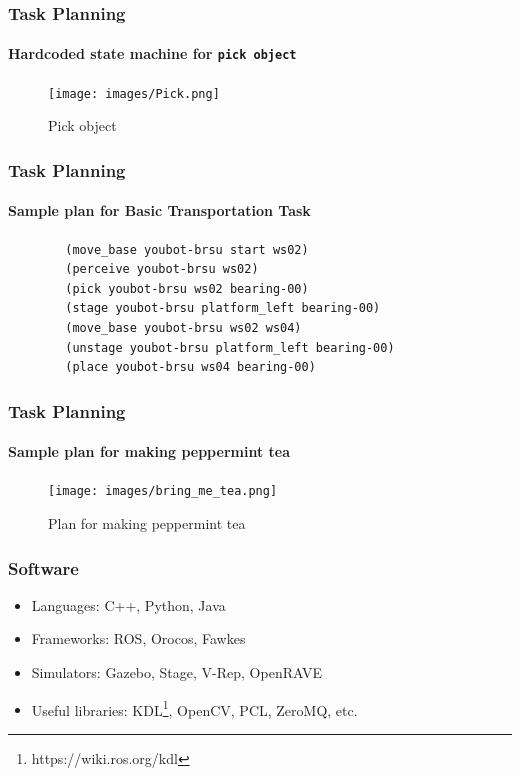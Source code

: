 \documentclass{beamer}
\begin{document}
\begin{frame}
\frametitle{Task Planning}
\framesubtitle{Hardcoded state machine for \texttt{pick object}}
\begin{figure}[H]
     \centering
     \texttt{[image: images/Pick.png]}
     \caption{Pick object~\cite{Lima}}
     \label{fig:pick}
\end{figure}
\end{frame}

\begin{frame}[fragile]
\frametitle{Task Planning}
\framesubtitle{Sample plan for Basic Transportation Task}
    \begin{verbatim}
        (move_base youbot-brsu start ws02)
        (perceive youbot-brsu ws02)
        (pick youbot-brsu ws02 bearing-00)
        (stage youbot-brsu platform_left bearing-00)
        (move_base youbot-brsu ws02 ws04)
        (unstage youbot-brsu platform_left bearing-00)
        (place youbot-brsu ws04 bearing-00)
    \end{verbatim}
\end{frame}

\begin{frame}
\frametitle{Task Planning}
\framesubtitle{Sample plan for making peppermint tea}
\begin{figure}[H]
     \centering
     \texttt{[image: images/bring\_me\_tea.png]}
     \caption{Plan for making peppermint tea~\cite{Awaad}}
     \label{fig:tea}
\end{figure}
\end{frame}

\begin{frame}
\frametitle{Software}
\begin{itemize}
    \item <1->Languages: C++, Python, Java
    \item <2->Frameworks: ROS, Orocos, Fawkes
    \item <3->Simulators: Gazebo, Stage, V-Rep, OpenRAVE
    \item <4->Useful libraries: KDL\footnote{https://wiki.ros.org/kdl}, OpenCV, PCL, ZeroMQ, etc.
\end{itemize}
\end{frame}
\end{document}
